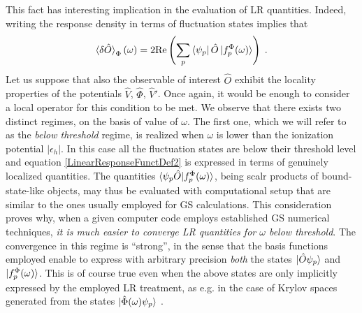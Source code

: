 \documentclass[reprint,aps,prb]{revtex4-1}
\newcommand{\eps}{\epsilon}
\newcommand{\be}{\begin{equation}}
\newcommand{\ee}{\end{equation}}
\newcommand{\lb}{\label}
\newcommand{\op}[1]{\hat {#1}}
\begin{document}
This fact has interesting implication in the evaluation of LR quantities.
%
% 
%
Indeed, writing the response 
density in terms of fluctuation states implies that 
\be\lb{LinearResponseFunctDef2}
\braket{\delta\op O}_\Phi(\omega) = 2\mathrm{Re} \left(\sum_p \bra{\psi_p}\op O\ket{f_p^\Phi(\omega)}\right) \;.
\ee
Let us suppose that also the observable of interest $\op O$ exhibit the locality properties of the potentials $ \op V$, $\op \Phi$, $\op V'$.
Once again, it would be enough to consider a local operator for this condition to be met.
We observe that there exists two 
distinct regimes, on the basis of value of $\omega$. 
The first one, which we will refer to as the \emph{below threshold} regime, is realized when
$\omega$ is lower than the ionization potential $|\eps_h|$.
In this case all the fluctuation states are below their threshold level and equation \eqref{LinearResponseFunctDef2} 
is expressed in terms of genuinely localized 
quantities. The quantities $\braket{\psi_p \op O| f_p^\Phi(\omega)}$, 
being scalr products of bound-state-like objects, may thus be evaluated with computational setup that
are similar to the ones usually employed for GS calculations.
This consideration proves why, when a given computer code employs established GS numerical techniques, 
\emph{it is much easier to converge LR quantities for $\omega$ below threshold}.
The convergence in this regime is ``strong'', in the sense that the basis functions employed enable to express 
with arbitrary precision \emph{both} the states $\ket{\op O \psi_p}$ and $\ket{f_p^\Phi(\omega)}$.
This is of course true even when the above states are only implicitly expressed by the employed LR treatment,
 as e.g. in the case of Krylov spaces generated from the states $\ket{\op\Phi(\omega) \psi_p}$ \cite{baroni2006,baroni2008,linlinKPM}.


\end{document}
